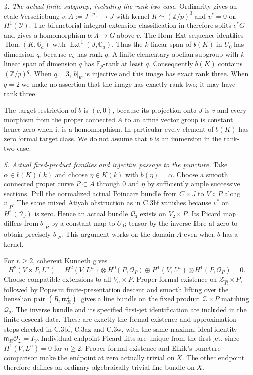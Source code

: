 \emph{4. The actual finite subgroup, including the rank-two case.}
Ordinarity gives an etale Verschiebung
$v:A:=J^{(p)}\to J$ with kernel $K\simeq(\mathbb Z/p)^3$ and
$v^*=0$ on $H^1(\mathcal O)$. The bifunctorial integral extension
classification in \citet[equation(3.8), Section3.2.3, p.~23]{D_BrionIsogenyII}
therefore splits $v^*G$ and gives a homomorphism $b:A\to G$ above $v$.
The Hom--Ext sequence identifies
$\operatorname{Hom}(K,\mathbb G_a)$ with
$\operatorname{Ext}^1(J,\mathbb G_a)$. Thus the $k$-linear span of
$b(K)$ in $U_0$ has dimension $q$, because $c_\kappa$ has rank $q$.
A finite elementary abelian subgroup with $k$-linear span of dimension
$q$ has $\mathbb F_p$-rank at least $q$. Consequently $b(K)$ contains
$(\mathbb Z/p)^q$. When $q=3$, $b|_K$ is injective and this image has
exact rank three. When $q=2$ we make no assertion that the image has
exactly rank two; it may have rank three.

The target restriction of $b$ is $(v,0)$, because its projection
onto $J$ is $v$ and every morphism from the proper connected $A$
to an affine vector group is constant, hence zero when it is a
homomorphism. In particular every element of $b(K)$ has zero
formal target class. We do not assume that $b$ is an immersion
in the rank-two case.

\emph{5. Actual fixed-product families and injective passage to the puncture.}
Take $\alpha\in b(K)(k)$ and choose $\eta\in K(k)$ with
$b(\eta)=\alpha$. Choose a smooth connected proper curve $P\subset A$
through $0$ and $\eta$ by sufficiently ample successive sections.
Pull the normalized actual Poincare bundle from $C\times J$ to
$V\times P$ along $v|_P$. The same mixed Atiyah obstruction as in
C.3bf vanishes because $v^*$ on $H^1(\mathcal O_J)$ is zero.
Hence an actual bundle $\mathcal Q_2$ exists on $V_2\times P$.
Its Picard map differs from $b|_P$ by a constant map to $U_0$;
tensor by the inverse fibre at zero to obtain precisely $b|_P$.
This argument works on the domain $A$ even when $b$ has a kernel.

For $n\ge2$, coherent Kunneth gives
\[
 H^2(V\times P,L^n)=
 H^2(V,L^n)\otimes H^0(P,\mathcal O_P)
 \oplus H^1(V,L^n)\otimes H^1(P,\mathcal O_P)=0.
\]
Choose compatible extensions to all $V_n\times P$. Proper formal
existence on $\mathcal Z_{\widehat R}\times P$, followed by Popescu
finite-presentation descent and smooth lifting over the henselian
pair $(R,\mathfrak m_R^2)$, gives a line bundle on the fixed product
$\mathcal Z\times P$ matching $\mathcal Q_2$. The inverse bundle and
its specified first-jet identification are included in the finite
descent data. These are exactly the formal-existence and approximation
steps checked in C.3bf, C.3az and C.3w, with the same maximal-ideal
identity $\mathfrak m_R\mathcal O_{\mathcal Z}=I_V$.
Individual endpoint Picard lifts are unique from the first jet,
since $H^1(V,L^n)=0$ for $n\ge2$. Proper formal existence and Elkik's
puncture comparison \citep[unnumbered corollary, p.~573]{D_Elkik1973}
make the endpoint at zero actually trivial on $X$. The other endpoint
therefore defines an ordinary algebraically trivial line bundle on $X$.

